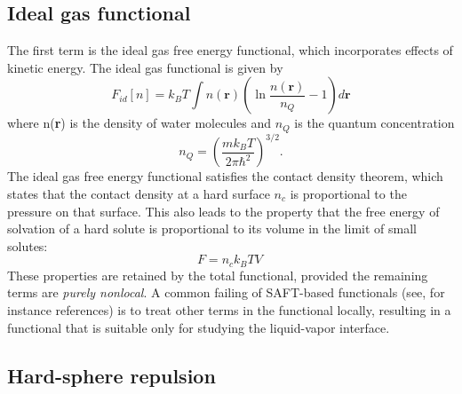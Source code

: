 \documentclass[letterpaper,twocolumn,amsmath,amssymb,prb]{revtex4-1}
\newcommand{\xx}{\textbf{r}}
\begin{document}
\subsection{Ideal gas functional}
The first term is the ideal gas free energy functional, which
incorporates effects of kinetic energy.  The ideal gas functional is
given by
\begin{equation}\label{idealgas}
  F_{id}[n] = k_B T \int n(\xx)\left( \ln{\frac{n(\xx)}{n_Q}} - 1\right) d\xx
\end{equation}
where n(\xx) is the density of water molecules and $n_Q$ is the
quantum concentration
\begin{equation}\label{quantumconcentration}
 n_Q =\left(\frac{mk_BT}{2\pi\hbar^2}\right)^{3/2}.
\end{equation}
The ideal gas free energy functional satisfies the contact density
theorem, which states that the contact density at a hard surface $n_c$
is proportional to the pressure on that surface. This
also leads to the property that the free energy of solvation of
a hard solute is proportional to its volume in the limit of small
solutes: 
\begin{equation}\label{contactvaluethm}
  F = n_c k_BT V\:
\end{equation}
These properties are retained by the total functional,
provided the remaining terms are \emph{purely nonlocal}.  A common
failing of SAFT-based functionals (see, for instance
references\cite{felipe2001examination, gloor2002saft,
  gloor2004accurate, clark2006developing, gloor2007prediction,
  kahl2008modified, gross2009density}) is to treat other terms in the
functional locally, resulting in a functional that is suitable only
for studying the liquid-vapor interface.


\subsection{Hard-sphere repulsion}
\end{document}
